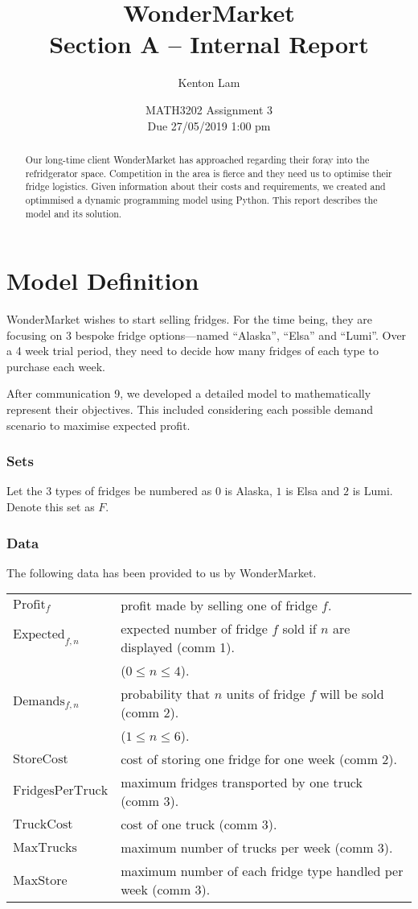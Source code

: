 \documentclass[11pt,a4paper]{article}
\author{Kenton Lam}
\date{{MATH3202 Assignment 3 \\ Due 27/05/2019 1:00 pm}}
\title{WonderMarket \\ Section A -- Internal Report}
\begin{document}
\maketitle
\begin{abstract}
    Our long-time client WonderMarket has approached regarding their foray into the 
    refridgerator space. Competition in the area is fierce and they need us 
    to optimise their fridge logistics.
    Given information about their costs and requirements, we created and
    optimmised a dynamic programming model using Python.
    This report describes the model and its solution.
\end{abstract}

\part{Model Definition}
WonderMarket wishes to start selling fridges. For the time being, they are focusing 
on 3 bespoke fridge options---named ``Alaska'', ``Elsa'' and ``Lumi''.
Over a 4 week trial period, they need to decide how many fridges of each type 
to purchase each week.

After communication 9, we developed a detailed model to mathematically represent
their objectives. This included considering each possible demand scenario to maximise 
expected profit.

\section{Sets}
Let the 3 types of fridges be numbered as $0$ is Alaska, $1$ is Elsa and $2$ is Lumi.
Denote this set as $F$.

\section{Data}
The following data has been provided to us by WonderMarket. 

\begin{tabular}{l l}
    $\mathrm{Profit}_{f}$ & profit made by selling one of fridge $f$. \\
    $\mathrm{Expected}_{f,n}$& expected number of fridge $f$ sold if $n$ are displayed (comm 1). \\
        & ($ 0 \le n \le 4$). \\ 
    $\mathrm{Demands}_{f, n}$ & probability that $n$ units of fridge $f$ will be sold (comm 2).\\
        & ($ 1 \le n \le 6$). \\ 
    $\mathrm{StoreCost}$ & cost of storing one fridge for one week (comm 2). \\
    $\mathrm{FridgesPerTruck}$ & maximum fridges transported by one truck (comm 3). \\ 
    $\mathrm{TruckCost}$ & cost of one truck (comm 3). \\ 
    $\mathrm{MaxTrucks}$ & maximum number of trucks per week (comm 3). \\ 
    $\mathrm{MaxStore}$ & maximum number of each fridge type handled per week (comm 3). \\
\end{tabular}
\end{document}
